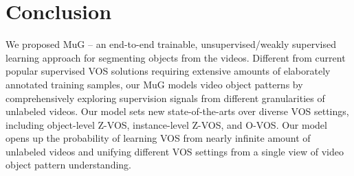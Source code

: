 \documentclass[10pt,twocolumn,letterpaper]{article}
\begin{document}
\vspace{-4pt}
\section{Conclusion}
\vspace{-4pt}
We proposed MuG -- an end-to-end trainable, unsupervised/weakly supervised learning approach for segmenting objects from the videos. Different from current popular supervised VOS solutions  requiring extensive amounts of elaborately annotated training samples, our MuG models video object patterns by comprehensively exploring supervision signals from different granularities of unlabeled videos. Our model sets new state-of-the-arts over diverse VOS settings, including object-level Z-VOS, instance-level Z-VOS, and O-VOS. Our model opens up the probability of learning VOS from nearly infinite amount of unlabeled videos and unifying different VOS settings from a single view of video object pattern understanding. 







{\small
	
	
}
\end{document}
